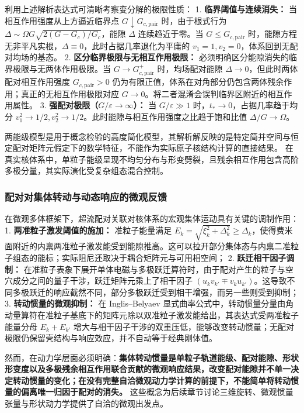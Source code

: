 利用上述解析表达式可清晰考察变分解的极限性质：
1. \textbf{临界阈值与连续消失：} 当相互作用强度从上方逼近临界点 $G \downarrow G_{c,\mathrm{pair}}$ 时，由于根式行为 $\Delta \sim \Omega G \sqrt{2(G - G_c)/G_c}$，能隙 $\Delta$ 连续趋近于零。当 $G \le G_{c,\mathrm{pair}}$ 时，能隙方程无非平凡实根，$\Delta \equiv 0$，此时占据几率退化为平庸的 $v_1 = 1, v_2 = 0$，体系回到无配对均场的基态。
2. \textbf{区分临界极限与无相互作用极限：} 必须明确区分能隙消失的临界极限与无两体作用极限。当 $G \to G_{c,\mathrm{pair}}^+$ 时，均场配对能隙 $\Delta \to 0$，但此时两体配对相互作用强度 $G_{c,\mathrm{pair}} > 0$ 仍为有限正值，体系在对角部分仍包含两体残余作用；真正的无相互作用极限对应 $G \to 0$。将二者混淆会误判临界区附近的相互作用属性。
3. \textbf{强配对极限（$G/\varepsilon \to \infty$）：} 当 $G/\varepsilon \gg 1$ 时，$t_* \to 0$，占据几率趋于均分 $v_1^2 \to 1/2, v_2^2 \to 1/2$。此时能隙与相互作用强度之比趋于饱和比值 $\Delta / G \to \Omega$。

两能级模型是用于概念检验的高度简化模型，其解析解反映的是特定简并空间与恒定配对矩阵元假定下的数学特征，不能作为实际原子核结构计算的直接结果。 在真实核体系中，单粒子能级呈现不均匀分布与形变劈裂，且残余相互作用包含高阶多极分量，其实际演化受复杂组态混合控制。


\subsubsection{配对对集体转动与动态响应的微观反馈}\label{sec:2-3-配对对集体转动与动态响应的微观反馈}


在微观多体框架下，超流配对关联对核体系的宏观集体运动具有关键的调制作用：
1. \textbf{两准粒子激发阈值的施加：} 准粒子能量满足 $E_k = \sqrt{\xi_k^2 + \Delta_k^2} \ge \Delta_k$，使得费米面附近的内禀两准粒子激发能受到能隙推高。这可以拉开部分集体态与内禀二准粒子组态的能标；实际阻尼还取决于耦合矩阵元与可用相空间；
2. \textbf{跃迁相干因子调制：} 在准粒子表象下展开单体电磁与多极跃迁算符时，由于配对产生的粒子与空穴成分之间的量子干涉，跃迁矩阵元乘上了相干因子 $(u_k v_{k'} \mp v_k u_{k'})$\cite{book-suhonen-from-nucleons-to-nucleus}。这导致不同多极跃迁的响应截然不同，部分多极跃迁受到相干增强，而另一些则受到抑制；
3. \textbf{转动惯量的微观抑制：} 在 Inglis–Belyaev 显式曲率公式中，转动惯量分量由角动量算符在准粒子基底下的矩阵元除以双准粒子激发能给出，其表达式受两准粒子能量分母 $E_k + E_{k'}$ 增大与相干因子干涉的双重压低，能够改变转动惯量；无配对极限仍保留壳结构与响应效应，并不自动等于经典刚体值。

然而，在动力学层面必须明确：\textbf{集体转动惯量是单粒子轨道能级、配对能隙、形状形变度以及多极残余相互作用联合贡献的微观响应结果，改变配对能隙并不单一决定转动惯量的变化；在没有完整自洽微观动力学计算的前提下，不能简单将转动惯量的偏离唯一归因于配对的消失。} 这些概念为后续章节讨论三维旋转、微观惯量张量与形状动力学提供了自洽的微观出发点。
